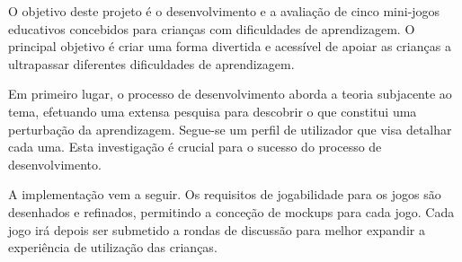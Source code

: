 


O objetivo deste projeto é o desenvolvimento e a avaliação de cinco mini-jogos educativos concebidos para crianças com dificuldades de aprendizagem. O principal objetivo é criar uma forma divertida e acessível de apoiar as crianças a ultrapassar diferentes dificuldades de aprendizagem.

Em primeiro lugar, o processo de desenvolvimento aborda a teoria subjacente ao tema, efetuando uma extensa pesquisa para descobrir o que constitui uma perturbação da aprendizagem. Segue-se um perfil de utilizador que visa detalhar cada uma. Esta investigação é crucial para o sucesso do processo de desenvolvimento.

A implementação vem a seguir. Os requisitos de jogabilidade para os jogos são desenhados e refinados, permitindo a conceção de mockups para cada jogo. Cada jogo irá depois ser submetido a rondas de discussão para melhor expandir a experiência de utilização das crianças.

